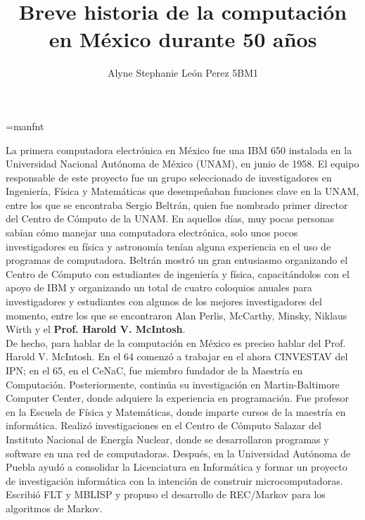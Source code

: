 \documentclass[a4paper,12pt]{article}
\begin{document}
	\title{Breve historia de la computación en México durante 50 años \cite{texbook}}
	\author{Alyne Stephanie León Perez 5BM1}
	\maketitle
	\font\logo=manfnt 
	\def\MF{{\logo META}\-{\logo FONT}}
	
	\noindent La primera computadora electrónica en México fue una IBM 650 instalada en la Universidad Nacional Autónoma de México (UNAM), en junio de 1958. El equipo responsable de este proyecto fue un grupo seleccionado de investigadores en Ingeniería, Física y Matemáticas que desempeñaban funciones clave en la UNAM, entre los que se encontraba Sergio Beltrán, quien fue nombrado primer director del Centro de Cómputo de la UNAM. En aquellos días, muy pocas personas sabían cómo manejar una computadora electrónica, solo unos pocos investigadores en física y astronomía tenían alguna experiencia en el uso de programas de computadora. Beltrán mostró un gran entusiasmo organizando el Centro de Cómputo con estudiantes de ingeniería y física, capacitándolos con el apoyo de IBM y organizando un total de cuatro coloquios anuales para investigadores y estudiantes con algunos de los mejores investigadores del momento, entre los que se encontraron Alan Perlis, McCarthy, Minsky, Niklaus Wirth y el {\bf Prof. Harold V. McIntosh}.\\
	De hecho, para hablar de la computación en México es preciso hablar del Prof. Harold V. McIntosh. En el 64 comenzó a trabajar en el ahora CINVESTAV del IPN; en el 65, en el CeNaC, fue miembro fundador de la Maestría en Computación. Posteriormente, continúa su investigación en Martin-Baltimore Computer Center, donde adquiere la experiencia en programación. Fue profesor en la Escuela de Física y Matemáticas, donde imparte cursos de la maestría en informática. Realizó investigaciones en el Centro de Cómputo Salazar del Instituto Nacional de Energía Nuclear, donde se desarrollaron programas y software en una red de computadoras. Después, en la Universidad Autónoma de Puebla ayudó a consolidar la Licenciatura en Informática y formar un proyecto de investigación informática con la intención de construir microcomputadoras. Escribió FLT y MBLISP y propuso el desarrollo de REC/Markov para los algoritmos de Markov.\\
\end{document}
